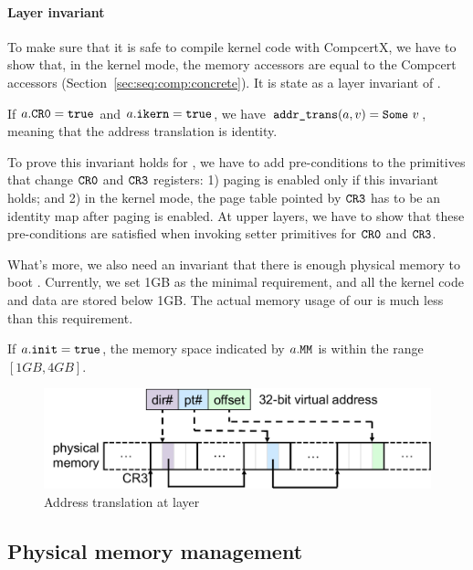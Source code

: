 \paragraph{Layer invariant}
To make sure that it is safe to compile
kernel code with CompcertX,
we have to show that, in the kernel mode,
the memory accessors are equal to the Compcert accessors
(\cf Section~\ref{sec:seq:comp:concrete}).
It is state as a layer invariant of .
\begin{invariant}
If $a.{\texttt{CR0}} = {\texttt{true}}$
and $a.{\texttt{ikern}} = {\texttt{true}}$,
we have $\code{addr\_trans}(a,v) = \code{Some}\ v$,
 meaning that the address translation is identity.
\end{invariant}

To prove this invariant holds for ,
we have to add pre-conditions
to the primitives that change ${\texttt{CR0}}$ and ${\texttt{CR3}}$
registers:
1) paging is enabled only if this invariant
holds;
and 2) in the kernel mode,
the page table pointed by ${\texttt{CR3}}$
has to be an identity map
after paging is enabled.
At upper layers,
we have to show that
these pre-conditions
are satisfied
when invoking setter primitives for ${\texttt{CR0}}$ and ${\texttt{CR3}}$.

What's more,
we also need an invariant that there is enough
physical memory to boot \mCTOS{}.
Currently, we set 1GB as the minimal requirement,
and all the kernel code and data are stored below
1GB. The actual memory usage of our \mCTOS{}
is much less than this requirement.
\begin{invariant}
If $a.{\texttt{init}} = {\texttt{true}}$,
the memory space indicated by $a.{\texttt{MM}}$
is within the range
$[1GB, 4GB]$.
\end{invariant}

\begin{figure}[t]\centering
\includegraphics[scale=.55]{figs/mem_model_1} 
\caption{Address translation at  layer}
\label{fig:seq:mem1}
\hrulefill
\end{figure}




\subsection{Physical memory management}
\label{sec:base:pmm} 

